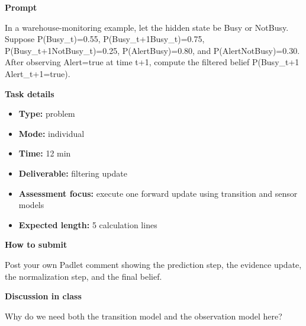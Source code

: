 \documentclass[11pt]{article}
\begin{document}
\begin{tcolorbox}[colback=white,colframe=MidnightBlue,title={Q2 Structured Problem},fonttitle=\bfseries,breakable]
\begin{center}
\end{center}

{\large\bfseries\color{MidnightBlue} Prompt}\par\medskip
In a warehouse-monitoring example, let the hidden state be Busy or NotBusy. Suppose P(Busy\_t)=0.55, P(Busy\_t+1\textbar Busy\_t)=0.75, P(Busy\_t+1\textbar NotBusy\_t)=0.25, P(Alert\textbar Busy)=0.80, and P(Alert\textbar NotBusy)=0.30. After observing Alert=true at time t+1, compute the filtered belief P(Busy\_t+1 \textbar{} Alert\_t+1=true).

{\large\bfseries\color{MidnightBlue} Task details}\par\medskip
\begin{itemize}\item \textbf{Type:} problem
\item \textbf{Mode:} individual
\item \textbf{Time:} 12 min
\item \textbf{Deliverable:} filtering update
\item \textbf{Assessment focus:} execute one forward update using transition and sensor models
\item \textbf{Expected length:} 5 calculation lines\end{itemize}

{\large\bfseries\color{MidnightBlue} How to submit}\par\medskip
Post your own Padlet comment showing the prediction step, the evidence update, the normalization step, and the final belief.

{\large\bfseries\color{MidnightBlue} Discussion in class}\par\medskip
Why do we need both the transition model and the observation model here?


\end{tcolorbox}
\end{document}
